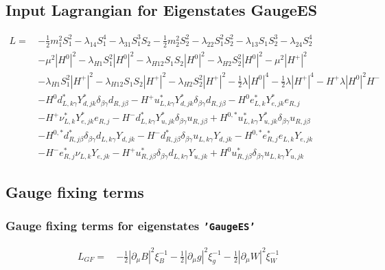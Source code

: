 \subsection{Input Lagrangian for Eigenstates GaugeES} 
\begin{align} 
L = \, & -\frac{1}{2} m_{1}^2 S_{1}^{2} - \lambda_{14} S_{1}^{4} - \lambda_{31} S_{1}^{3} S_{2} -\frac{1}{2} m_{2}^2 S_{2}^{2} - \lambda_{22} S_{1}^{2} S_{2}^{2} - \lambda_{13} S_{1} S_{2}^{3} - \lambda_{24} S_{2}^{4} \nonumber \\ 
 &- \mu^2 |H^0|^2 - \lambda_{H1} S_{1}^{2} |H^0|^2 - \lambda_{H12} S_{1} S_{2} |H^0|^2 - \lambda_{H2} S_{2}^{2} |H^0|^2 - \mu^2 |H^+|^2 \nonumber \\ 
 &- \lambda_{H1} S_{1}^{2} |H^+|^2 - \lambda_{H12} S_{1} S_{2} |H^+|^2 - \lambda_{H2} S_{2}^{2} |H^+|^2 -\frac{1}{2} \lambda |H^0|^4 -\frac{1}{2} \lambda |H^+|^4 - H^+ \lambda |H^0|^2 H^- \nonumber \\ 
 &- H^0 d^*_{L,{k \gamma}} Y^*_{d,{j k}} \delta_{\beta \gamma} d_{R,{j \beta}} - H^+ u^*_{L,{k \gamma}} Y^*_{d,{j k}} \delta_{\beta \gamma} d_{R,{j \beta}} - H^0 e^*_{L,{k}} Y^*_{e,{j k}} e_{R,{j}} \nonumber \\ 
 &- H^+ \nu^*_{L,{k}} Y^*_{e,{j k}} e_{R,{j}} - H^- d^*_{L,{k \gamma}} Y^*_{u,{j k}} \delta_{\beta \gamma} u_{R,{j \beta}} +H^{0,*} u^*_{L,{k \gamma}} Y^*_{u,{j k}} \delta_{\beta \gamma} u_{R,{j \beta}} \nonumber \\ 
 &- H^{0,*} d^*_{R,{j \beta}} \delta_{\beta \gamma} d_{L,{k \gamma}} Y_{d,{j k}} - H^- d^*_{R,{j \beta}} \delta_{\beta \gamma} u_{L,{k \gamma}} Y_{d,{j k}} - H^{0,*} e^*_{R,{j}} e_{L,{k}} Y_{e,{j k}} \nonumber \\ 
 &- H^- e^*_{R,{j}} \nu_{L,{k}} Y_{e,{j k}} - H^+ u^*_{R,{j \beta}} \delta_{\beta \gamma} d_{L,{k \gamma}} Y_{u,{j k}} +H^0 u^*_{R,{j \beta}} \delta_{\beta \gamma} u_{L,{k \gamma}} Y_{u,{j k}} 
\end{align} 
\subsection{Gauge fixing terms} 
\subsubsection{Gauge fixing terms for eigenstates {\tt 'GaugeES'} } 
\begin{align} 
L_{GF} = \, &-\frac{1}{2} |\partial_{\mu}B|^2 \xi_{B}^{-1}  -\frac{1}{2} |\partial_{\mu}g|^2 \xi_{g}^{-1}  -\frac{1}{2} |\partial_{\mu}W|^2 \xi_{W}^{-1} 
\end{align} 
